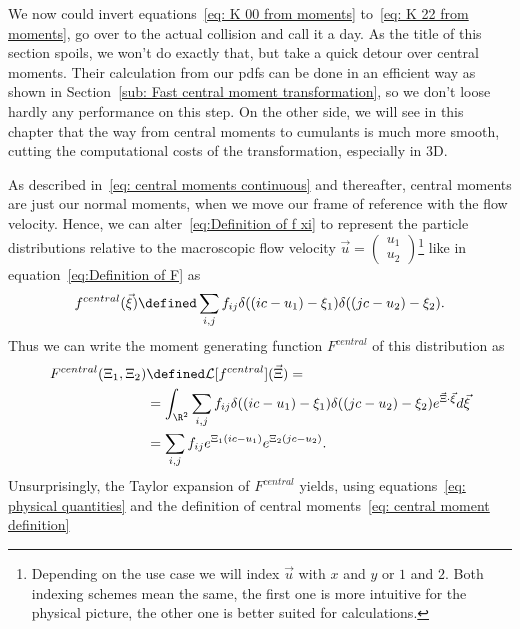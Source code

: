 We now could invert equations~\eqref{eq: K 00 from moments} to~\eqref{eq: K 22 from moments}, go over to the actual collision and call it a day.
As the title of this section spoils, we won't do exactly that, but take a quick detour over central moments.
Their calculation from our \glspl{pdf} can be done in an efficient way as shown in Section~\ref{sub: Fast central moment transformation},
so we don't loose hardly any performance on this step.
On the other side, we will see in this chapter that the way from central moments to cumulants is much more smooth, cutting the computational costs of the transformation, especially in 3D.

As described in~\eqref{eq: central moments continuous} and thereafter, central moments are just our normal moments, when we move our frame of reference with the flow velocity.
Hence, we can alter~\eqref{eq:Definition of f xi} to represent the particle distributions relative to the macroscopic flow velocity $\vec{u}=\begin{pmatrix}u_1\\u_2\end{pmatrix}$\footnote{Depending on the use case we will index $\vec{u}$ with $x$ and $y$ or $1$ and $2$. Both indexing schemes mean the same, the first one is more intuitive for the physical picture, the other one is better suited for calculations.} like in equation~\eqref{eq:Definition of F} as
\begin{equation}
  \label{eq:Definition of f c xi}
  f^{central}(\vec{\xi}) \defined \sum_{i,j} f_{ij}\delta((ic - u_1) - \xi_1)\delta((jc - u_2) -\xi_2) .
\end{equation}
Thus we can write the moment generating function $F^{central}$ of this distribution as
\begin{equation}
  \label{eq: Definition of centralized F}
  \begin{aligned}
    F^{central}(\Xi_1, \Xi_2) & \defined \mathcal{L}[f^{central}](\vec{\Xi}) =  \\
    & = \int_{\R^2} \sum_{i,j} f_{ij}\delta((ic - u_1) - \xi_1)\delta((jc - u_2) -\xi_2) e^{\vec{\Xi} \cdot \vec{\xi}}d\vec{\xi} \\
    & =\sum_{i,j} f_{ij} e^{\Xi_1(ic - u_1)} e^{\Xi_2(jc - u_2)}.
  \end{aligned}
\end{equation}
Unsurprisingly, the Taylor expansion of $F^{central}$ yields, using equations~\eqref{eq: physical quantities} and the definition of central moments~\eqref{eq: central moment definition}
